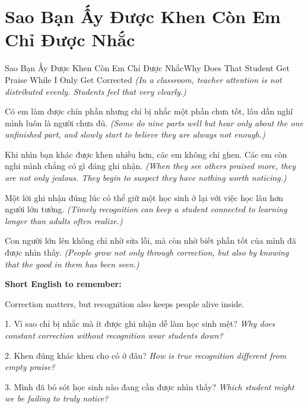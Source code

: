 \section{Sao Bạn Ấy Được Khen Còn Em Chỉ Được Nhắc}
\begin{truyen}{Sao Bạn Ấy Được Khen Còn Em Chỉ Được Nhắc}{Why Does That Student Get Praise While I Only Get Corrected}
\textit{(In a classroom, teacher attention is not distributed evenly. Students feel that very clearly.)}

Có em làm được chín phần nhưng chỉ bị nhắc một phần chưa tốt, lâu dần nghĩ mình luôn là người chưa đủ.
\textit{(Some do nine parts well but hear only about the one unfinished part, and slowly start to believe they are always not enough.)}

Khi nhìn bạn khác được khen nhiều hơn, các em không chỉ ghen. Các em còn nghi mình chẳng có gì đáng ghi nhận.
\textit{(When they see others praised more, they are not only jealous. They begin to suspect they have nothing worth noticing.)}

Một lời ghi nhận đúng lúc có thể giữ một học sinh ở lại với việc học lâu hơn người lớn tưởng.
\textit{(Timely recognition can keep a student connected to learning longer than adults often realize.)}
\end{truyen}

\begin{baihoc}
Con người lớn lên không chỉ nhờ sửa lỗi, mà còn nhờ biết phần tốt của mình đã được nhìn thấy.
\textit{(People grow not only through correction, but also by knowing that the good in them has been seen.)}
\end{baihoc}

\begin{ghinhoanh}
\textbf{Short English to remember:}

Correction matters, but recognition also keeps people alive inside.

\end{ghinhoanh}

\begin{tuhocnhanh}
1. Vì sao chỉ bị nhắc mà ít được ghi nhận dễ làm học sinh mệt? \textit{Why does constant correction without recognition wear students down?}

2. Khen đúng khác khen cho có ở đâu? \textit{How is true recognition different from empty praise?}

3. Mình đã bỏ sót học sinh nào đang cần được nhìn thấy? \textit{Which student might we be failing to truly notice?}
\end{tuhocnhanh}
\ngancach

